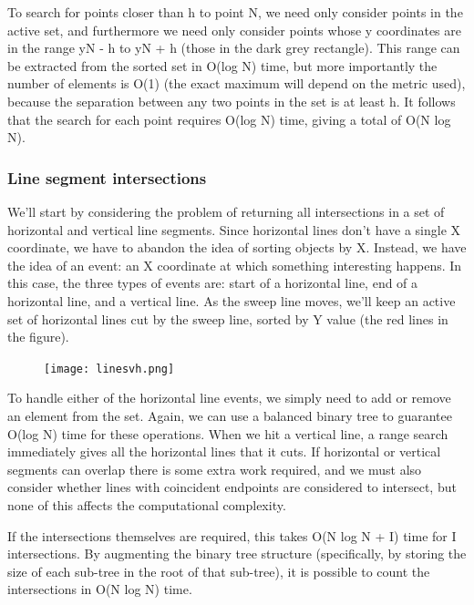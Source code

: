 \documentclass[a4paper,12pt]{article}
\begin{document}
To search for points closer than h to point N, we need only consider points in the active set, and furthermore we need only consider points whose y coordinates are in the range yN - h to yN + h (those in the dark grey rectangle). This range can be extracted from the sorted set in O(log N) time, but more importantly the number of elements is O(1) (the exact maximum will depend on the metric used), because the separation between any two points in the set is at least h. It follows that the search for each point requires O(log N) time, giving a total of O(N log N).

\subsubsection{Line segment intersections} \indent

We'll start by considering the problem of returning all intersections in a set of 
horizontal and vertical line segments. Since horizontal lines don't have a single X 
coordinate, we have to abandon the idea of sorting objects by X. Instead, we have the idea 
of an event: an X coordinate at which something interesting happens. In this case, the three 
types of events are: start of a horizontal line, end of a horizontal line, and a vertical 
line. As the sweep line moves, we'll keep an active set of horizontal lines cut by the sweep 
line, sorted by Y value (the red lines in the figure).

\begin{figure}[ht]
  \centering
  \texttt{[image: linesvh.png]}
\end{figure}

To handle either of the horizontal line events, we simply need to add or remove an element 
from the set. Again, we can use a balanced binary tree to guarantee O(log N) time for these 
operations. When we hit a vertical line, a range search immediately gives all the horizontal 
lines that it cuts. If horizontal or vertical segments can overlap there is some extra work 
required, and we must also consider whether lines with coincident endpoints are considered 
to intersect, but none of this affects the computational complexity.

If the intersections themselves are required, this takes O(N log N + I) time for I 
intersections. By augmenting the binary tree structure (specifically, by storing the size of 
each sub-tree in the root of that sub-tree), it is possible to count the intersections in 
O(N log N) time.
\end{document}
